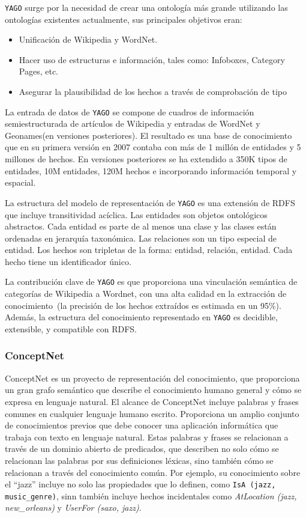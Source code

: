 \texttt{YAGO} surge por la necesidad de crear una ontología más grande utilizando las ontologías existentes actualmente, sus principales objetivos eran:
\begin{itemize}
  \item Unificación de Wikipedia y WordNet.
  \item Hacer uso de estructuras e información, tales como: Infoboxes, Category Pages, etc.
  \item Asegurar la plausibilidad de los hechos a través de comprobación de tipo
\end{itemize}

La entrada de datos de \texttt{YAGO} se compone de cuadros de información semiestructurada de artículos de Wikipedia y entradas de WordNet y Geonames(en versiones posteriores).
El resultado es una base de conocimiento que en su primera versión en 2007 contaba con más de 1 millón de entidades y 5 millones de hechos.
En versiones posteriores se ha extendido a 350K tipos de entidades, 10M entidades, 120M hechos e incorporando información temporal y espacial.

La estructura del modelo de representación de \texttt{YAGO} es una extensión de RDFS que incluye transitividad acíclica.
Las entidades son objetos ontológicos abstractos.
Cada entidad es parte de al menos una clase y las clases están ordenadas en jerarquía taxonómica.
Las relaciones son un tipo especial de entidad.
Los hechos son tripletas de la forma: entidad, relación, entidad.
Cada hecho tiene un identificador único.

La contribución clave de \texttt{YAGO} es que proporciona una vinculación semántica de categorías de Wikipedia a Wordnet, con una alta calidad en la extracción de conocimiento~(la precisión de los hechos extraídos es estimada en un 95\%).
Además, la estructura del conocimiento representado en \texttt{YAGO} es decidible, extensible, y compatible con RDFS.

\subsubsection*{ConceptNet}

ConceptNet es un proyecto de representación del conocimiento, que proporciona un gran grafo semántico que describe el conocimiento humano general y cómo se expresa en lenguaje natural.
El alcance de ConceptNet incluye palabras y frases comunes en cualquier lenguaje humano escrito.
Proporciona un amplio conjunto de conocimientos previos que debe conocer una aplicación informática que trabaja con texto en lenguaje natural.
Estas palabras y frases se relacionan a través de un dominio abierto de predicados, que describen no solo cómo se relacionan las palabras por sus definiciones léxicas, sino también cómo se relacionan a través del conocimiento común.
Por ejemplo, su conocimiento sobre el “jazz” incluye no solo las propiedades que lo definen, como \texttt{IsA (jazz, music\_genre)}, sinn también incluye hechos incidentales como \textit{AtLocation (jazz, new\_orleans)} y \textit{UserFor (saxo, jazz)}.

